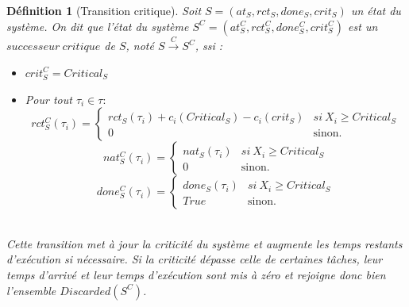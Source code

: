 \documentclass[a4paper]{report}
\theoremstyle{break}
\newtheorem{defin}{Définition}
\theoremstyle{breakplain}
\begin{document}
\begin{defin}[Transition critique]
\label{tcrit}
Soit $S = (at_S, rct_S, done_S, crit_S)$ un état du système. On dit que l'état du système $S^C = (at_S^C, rct_S^C, done_S^C, crit_S^C)$ est un $successeur\ critique$ de $S$, noté $S\xrightarrow{C}S^C$, ssi :
\begin{itemize}
\item $crit_S^C = Critical_S$
\item Pour tout $\tau_i \in \tau :$
$$ rct_S^C(\tau_i) = \left\{
    \begin{array}{ll}
        rct_S(\tau_i)+c_i(Critical_S)-c_i(crit_S) & si\ X_i\geq Critical_S \\
        0 & \mbox{sinon.}
    \end{array}
\right.
$$
$$ nat_S^C(\tau_i) = \left\{
    \begin{array}{ll}
        nat_S(\tau_i) & si\ X_i\geq Critical_S \\
        0 & \mbox{sinon.}
    \end{array}
\right.
$$
$$ done_S^C(\tau_i) = \left\{
    \begin{array}{ll}
        done_S(\tau_i) & si\ X_i\geq Critical_S \\
        True & \mbox{sinon.}
    \end{array}
\right.
$$\\
\end{itemize}
Cette transition met à jour la criticité du système et augmente les temps restants d'exécution si nécessaire. Si la criticité dépasse celle de certaines tâches, leur temps d'arrivé et leur temps d'exécution sont mis à zéro et rejoigne donc bien l'ensemble $Discarded(S^C)$.
\end{defin}
\end{document}
